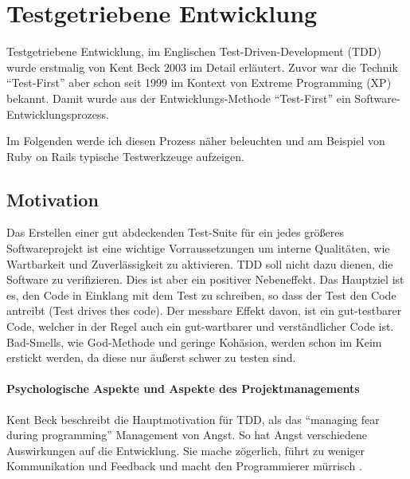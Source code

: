\section{Testgetriebene Entwicklung}
Testgetriebene Entwicklung, im Englischen Test-Driven-Development (TDD) wurde erstmalig von Kent Beck 2003 im Detail erläutert. Zuvor war die Technik "`Test-First"' aber schon seit 1999 im Kontext von Extreme Programming (XP) bekannt.
Damit wurde aus der Entwicklungs-Methode "`Test-First"' ein Software-Entwicklungsprozess. 

Im Folgenden werde ich diesen Prozess näher beleuchten und am Beispiel von Ruby on Rails typische Testwerkzeuge aufzeigen. 
\subsection{Motivation}
  Das Erstellen einer gut abdeckenden Test-Suite für ein jedes größeres Softwareprojekt ist eine wichtige Vorraussetzungen um interne Qualitäten, wie Wartbarkeit und Zuverlässigkeit zu aktivieren. TDD soll nicht dazu dienen, die Software zu verifizieren. Dies ist aber ein positiver Nebeneffekt. Das Hauptziel ist es, den Code in Einklang mit dem Test zu schreiben, so dass der Test den Code antreibt (Test drives thes code). Der messbare Effekt davon, ist ein gut-testbarer Code, welcher in der Regel auch ein gut-wartbarer und verständlicher Code ist. Bad-Smells, wie God-Methode und geringe Kohäsion, werden schon im Keim erstickt werden, da diese nur äußerst schwer zu testen sind.

  \paragraph{Psychologische Aspekte und Aspekte des Projektmanagements}
  
  Kent Beck beschreibt die Hauptmotivation für TDD, als das "`managing fear during programming"' Management von Angst. So hat Angst verschiedene Auswirkungen auf die Entwicklung. Sie mache zögerlich, führt zu weniger Kommunikation und Feedback und macht den Programmierer mürrisch \citep[S. xi]{beck_test_2002}.
  
  
